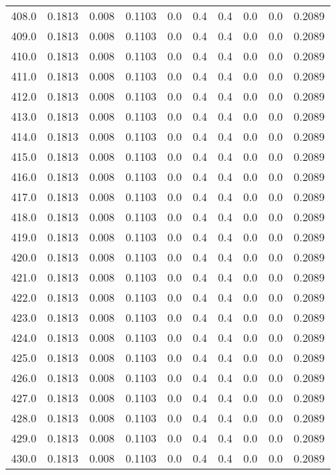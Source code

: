 \begin{longtable}{lrrrrrrrrr}
408.0 & 0.1813 & 0.008 & 0.1103 & 0.0 & 0.4 & 0.4 & 0.0 & 0.0 & 0.2089 \\
409.0 & 0.1813 & 0.008 & 0.1103 & 0.0 & 0.4 & 0.4 & 0.0 & 0.0 & 0.2089 \\
410.0 & 0.1813 & 0.008 & 0.1103 & 0.0 & 0.4 & 0.4 & 0.0 & 0.0 & 0.2089 \\
411.0 & 0.1813 & 0.008 & 0.1103 & 0.0 & 0.4 & 0.4 & 0.0 & 0.0 & 0.2089 \\
412.0 & 0.1813 & 0.008 & 0.1103 & 0.0 & 0.4 & 0.4 & 0.0 & 0.0 & 0.2089 \\
413.0 & 0.1813 & 0.008 & 0.1103 & 0.0 & 0.4 & 0.4 & 0.0 & 0.0 & 0.2089 \\
414.0 & 0.1813 & 0.008 & 0.1103 & 0.0 & 0.4 & 0.4 & 0.0 & 0.0 & 0.2089 \\
415.0 & 0.1813 & 0.008 & 0.1103 & 0.0 & 0.4 & 0.4 & 0.0 & 0.0 & 0.2089 \\
416.0 & 0.1813 & 0.008 & 0.1103 & 0.0 & 0.4 & 0.4 & 0.0 & 0.0 & 0.2089 \\
417.0 & 0.1813 & 0.008 & 0.1103 & 0.0 & 0.4 & 0.4 & 0.0 & 0.0 & 0.2089 \\
418.0 & 0.1813 & 0.008 & 0.1103 & 0.0 & 0.4 & 0.4 & 0.0 & 0.0 & 0.2089 \\
419.0 & 0.1813 & 0.008 & 0.1103 & 0.0 & 0.4 & 0.4 & 0.0 & 0.0 & 0.2089 \\
420.0 & 0.1813 & 0.008 & 0.1103 & 0.0 & 0.4 & 0.4 & 0.0 & 0.0 & 0.2089 \\
421.0 & 0.1813 & 0.008 & 0.1103 & 0.0 & 0.4 & 0.4 & 0.0 & 0.0 & 0.2089 \\
422.0 & 0.1813 & 0.008 & 0.1103 & 0.0 & 0.4 & 0.4 & 0.0 & 0.0 & 0.2089 \\
423.0 & 0.1813 & 0.008 & 0.1103 & 0.0 & 0.4 & 0.4 & 0.0 & 0.0 & 0.2089 \\
424.0 & 0.1813 & 0.008 & 0.1103 & 0.0 & 0.4 & 0.4 & 0.0 & 0.0 & 0.2089 \\
425.0 & 0.1813 & 0.008 & 0.1103 & 0.0 & 0.4 & 0.4 & 0.0 & 0.0 & 0.2089 \\
426.0 & 0.1813 & 0.008 & 0.1103 & 0.0 & 0.4 & 0.4 & 0.0 & 0.0 & 0.2089 \\
427.0 & 0.1813 & 0.008 & 0.1103 & 0.0 & 0.4 & 0.4 & 0.0 & 0.0 & 0.2089 \\
428.0 & 0.1813 & 0.008 & 0.1103 & 0.0 & 0.4 & 0.4 & 0.0 & 0.0 & 0.2089 \\
429.0 & 0.1813 & 0.008 & 0.1103 & 0.0 & 0.4 & 0.4 & 0.0 & 0.0 & 0.2089 \\
430.0 & 0.1813 & 0.008 & 0.1103 & 0.0 & 0.4 & 0.4 & 0.0 & 0.0 & 0.2089 \\

\end{longtable}
